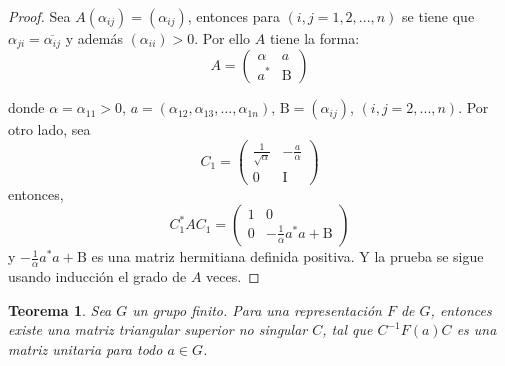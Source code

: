 \documentclass[12pt]{book}
\newtheorem{theorem}{Teorema}[section]
\theoremstyle{definition}
\newcounter{in}
\newcounter{ini}
\begin{document}
\begin{proof}
  Sea $A\left(\alpha_{ij}\right)=(\alpha_{ij})$, entonces para
  $\left(i,j=1,2,...,n\right)$ se tiene que
  $\alpha_{ji}=\overline{\alpha_{ij}}$ y además
  $\left(\alpha_{ii}\right)>0$. Por ello $A$ tiene la forma:
  \begin{equation}
    \label{eq:2}
     A=
     \begin{pmatrix}
    \alpha & a \\ 
    a^{*} & \mathrm{B}
  \end{pmatrix}
  \end{equation} 

  donde $\alpha=\alpha_{11}>0$,
  $ a= \left(\alpha_{12},\alpha_{13},...,\alpha_{1n} \right) $,
  $ \mathrm{B}=\left(\alpha_{ij}\right)$,
  $ \left(i,j=2,...,n\right) $. Por otro lado, sea
\begin{equation}
  \label{eq:3}
  C_{1}=
  \begin{pmatrix}
    \frac{1}{\sqrt{\alpha}} & -\frac{a}{\alpha} \\ 
    0 & \mathrm{I}
  \end{pmatrix}
\end{equation}
entonces, 
\begin{equation}
   \label{eq:4}
  C_{1}^{*}AC_{1} =
  \begin{pmatrix}
    1 & 0 \\ 
    0 & -\frac{1}{\alpha}a^{*}a+\mathrm{B}
  \end{pmatrix}
\end{equation}  
y $-\frac{1}{\alpha}a^{*}a+\mathrm{B}$ es una matriz hermitiana
definida positiva. Y la prueba se sigue usando inducción el grado de
$A$ veces.
\end{proof}

\begin{theorem}
  \label{t2_3}
  Sea $G$ un grupo finito. Para una representación $F$ de $G$,
  entonces existe una matriz triangular superior no singular $C$,
  tal que $C^{-1}F\left(a\right)C$ es una matriz unitaria para todo
  $a \in G$.
\end{theorem}
\end{document}
